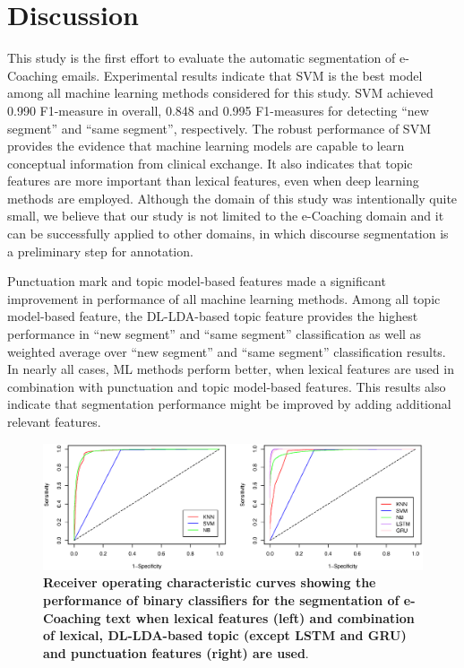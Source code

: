 \documentclass{amia}
\begin{document}
\section*{Discussion}
This study is the first effort to evaluate the automatic segmentation of e-Coaching emails. Experimental results indicate that SVM is the best model among all machine learning methods considered for this study. SVM achieved 0.990 F1-measure in overall, 0.848 and 0.995 F1-measures for detecting ``new segment'' and ``same segment'', respectively. The robust performance of SVM provides the evidence that machine learning models are capable to learn conceptual information from clinical exchange. It also indicates that topic features are more important than lexical features, even when deep learning methods are employed. Although the domain of this study was intentionally quite small, we believe that our study is not limited to the e-Coaching domain and it can be successfully applied to other domains, in which discourse segmentation is a preliminary step for annotation.

Punctuation mark and topic model-based features made a significant improvement in performance of all machine learning methods. Among all topic model-based feature, the DL-LDA-based topic feature provides the highest performance in ``new segment'' and ``same segment'' classification as well as weighted average over ``new segment'' and ``same segment'' classification results. In nearly all cases, ML methods perform better, when lexical features are used in combination with punctuation and topic model-based features. This results also indicate that segmentation performance might be improved by adding additional relevant features.         

\begin{figure}[!htb]
    \centering
    \includegraphics[width=1.0\textwidth]{figures/roc-curves.eps}
    \caption{\textbf{Receiver operating characteristic curves showing the performance of binary classifiers for the segmentation of e-Coaching text when lexical features (left) and combination of lexical, DL-LDA-based topic (except LSTM and GRU) and punctuation features (right) are used}.}
    \label{fig:roc-curves}
\end{figure}
\end{document}
